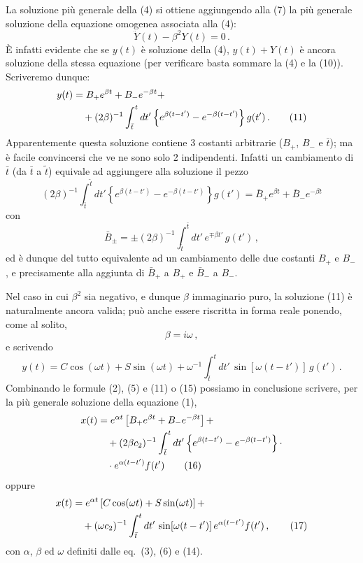 \documentclass[11pt, a4paper]{book}
\numberwithin{equation}{section}
\begin{document}
La soluzione più generale della (4) si ottiene aggiungendo alla (7) la più
generale soluzione della equazione omogenea associata alla (4):
\begin{equation}
    \ddot{Y}(t) - \beta^2 Y(t) = 0 \,.
\end{equation}
È infatti evidente che se $y(t)$ è soluzione della (4), $y(t) + Y(t)$ è ancora
soluzione della stessa equazione (per verificare basta sommare la (4) e la
(10)). Scriveremo dunque:
\begin{align}
    y(t) &= B_+ e^{\beta t} + B_- e^{-\beta t} + \notag \\
    &\quad + (2\beta)^{-1} \int_{\bar{t}}^{t} dt' \left\{ e^{\beta(t-t')} - e^{-\beta(t-t')} \right\} g(t') \,. \tag{11}
\end{align}
Apparentemente questa soluzione contiene 3 costanti arbitrarie ($B_+$, $B_-$ e
$\bar{t}$); ma è facile convincersi che ve ne sono solo 2 indipendenti. Infatti un
cambiamento di $\bar{t}$ (da $\bar{t}$ a $\tilde{t}$) equivale ad aggiungere alla soluzione il
pezzo
\begin{equation}
    (2\beta)^{-1} \int_{\bar{t}}^{\tilde{t}} dt' \left\{ e^{\beta(t-t')} - e^{-\beta(t-t')} \right\} g(t') =
    \bar{B}_+ e^{\beta t} + \bar{B}_- e^{-\beta t} \tag{12}
\end{equation}
con
\begin{equation}
    \bar{B}_\pm = \pm (2\beta)^{-1} \int_{\tilde{t}}^{\bar{t}} dt' \, e^{\mp \beta t'} \, g(t') \,, \tag{13}
\end{equation}
ed è dunque del tutto equivalente ad un cambiamento delle due costanti $B_+$ e
$B_-$, e precisamente alla aggiunta di $\bar{B}_+$ a $B_+$ e $\bar{B}_-$ a $B_-$.

Nel caso in cui $\beta^2$ sia negativo, e dunque $\beta$ immaginario puro, la
soluzione (11) è naturalmente ancora valida; può anche essere riscritta in
forma reale ponendo, come al solito,
\begin{equation}
    \beta = i\omega \,, \tag{14}
\end{equation}
e scrivendo
\begin{equation}
    y(t) = C \cos(\omega t) + S \sin(\omega t) + \omega^{-1} \int_{\bar{t}}^{t} dt' \, \sin[\omega(t-t')] \, g(t') \,. \tag{15}
\end{equation}
Combinando le formule (2), (5) e (11) o (15) possiamo in conclusione scrivere,
per la più generale soluzione della equazione (1),
\begin{align}
    x(t) &= e^{\alpha t} \left[ B_+ e^{\beta t} + B_- e^{-\beta t} \right] + \notag \\
    &\quad + (2\beta c_2)^{-1} \int_{\bar{t}}^{t} dt' \left\{ e^{\beta(t-t')} - e^{-\beta(t-t')} \right\} \cdot \notag \\
    &\quad \cdot e^{\alpha(t-t')} f(t') \tag{16}
\end{align}
oppure
\begin{align}
    x(t) &= e^{\alpha t} \left[ C \cos(\omega t) + S \sin(\omega t) \right] + \notag \\
    &\quad + (\omega c_2)^{-1} \int_{\bar{t}}^{t} dt' \, \sin[\omega(t-t')] \, e^{\alpha(t-t')} f(t') \,, \tag{17}
\end{align}
con $\alpha$, $\beta$ ed $\omega$ definiti dalle eq.~(3), (6) e (14).
\end{document}
